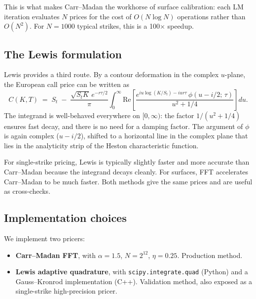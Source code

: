 \documentclass[11pt]{article}
\theoremstyle{plain}
\theoremstyle{definition}
\theoremstyle{remark}
\begin{document}
This is what makes Carr--Madan the workhorse of surface calibration: each LM iteration evaluates \(N\) prices for the cost of \(O(N \log N)\) operations rather than \(O(N^2)\). For \(N = 1000\) typical strikes, this is a 100\(\times\) speedup.

\subsection{The Lewis formulation}

Lewis \cite{Lewis2000} provides a third route. By a contour deformation in the complex \(u\)-plane, the European call price can be written as
\begin{equation}
    C(K, T) \;=\; S_t \;-\; \frac{\sqrt{S_t K}\, e^{-r\tau/2}}{\pi} \int_0^\infty \mathrm{Re}\!\left[\frac{e^{i u \log(K/S_t) - i u r \tau}\,\phi\!\left(u - i/2;\, \tau\right)}{u^2 + 1/4}\right] du.                                                                  \label{eq:lewis-call}
\end{equation}
The integrand is well-behaved everywhere on \([0, \infty)\): the factor \(1/(u^2 + 1/4)\) ensures fast decay, and there is no need for a damping factor. The argument of \(\phi\) is again complex (\(u - i/2\)), shifted to a horizontal line in the complex plane that lies in the analyticity strip of the Heston characteristic function.

For single-strike pricing, Lewis is typically slightly faster and more accurate than Carr--Madan because the integrand decays cleanly. For surfaces, FFT accelerates Carr--Madan to be much faster. Both methods give the same prices and are useful as cross-checks.

\subsection{Implementation choices}

We implement two pricers:

\begin{itemize}[topsep=2pt]
    \item \textbf{Carr--Madan FFT}, with \(\alpha = 1.5\), \(N = 2^{12}\), \(\eta = 0.25\). Production method.
    \item \textbf{Lewis adaptive quadrature}, with \texttt{scipy.integrate.quad} (Python) and a Gauss--Kronrod implementation (C++). Validation method, also exposed as a single-strike high-precision pricer.
\end{itemize}
\end{document}
